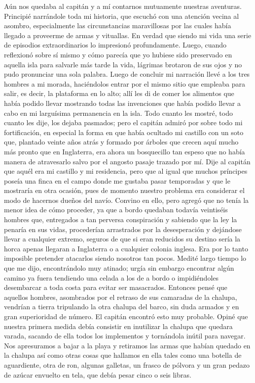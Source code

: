 \documentclass{novela}
\begin{document}
    Aún nos quedaba al capitán y a mí contarnos mutuamente nuestras aventuras. Principié narrándole toda mi historia, que escuchó con una atención vecina al asombro, especialmente las circunstancias maravillosas por las cuales había llegado a proveerme de armas y vituallas. En verdad que siendo mi vida una serie de episodios extraordinarios lo impresionó profundamente. Luego, cuando reflexionó sobre sí mismo y cómo parecía que yo hubiese sido preservado en aquella isla para salvarle más tarde la vida, lágrimas brotaron de sus ojos y no pudo pronunciar una sola palabra.
    Luego de concluir mi narración llevé a los tres hombres a mi morada, haciéndolos entrar por el mismo sitio que empleaba para salir, es decir, la plataforma en lo alto; allí les di de comer los alimentos que había podido llevar mostrando todas las invenciones que había podido llevar a cabo en mi larguísima permanencia en la isla.
    Todo cuanto les mostré, todo cuanto les dije, los dejaba pasmados; pero el capitán admiró por sobre todo mi fortificación, en especial la forma en que había ocultado mi castillo con un soto que, plantado veinte años atrás y formado por árboles que crecen aquí mucho más pronto que en Inglaterra, era ahora un bosquecillo tan espeso que no había manera de atravesarlo salvo por el angosto pasaje trazado por mí. Dije al capitán que aquél era mi castillo y mi residencia, pero que al igual que muchos príncipes poseía una finca en el campo donde me gustaba pasar temporadas y que le mostraría en otra ocasión, pues de momento nuestro problema era considerar el modo de hacernos dueños del navío.
    Convino en ello, pero agregó que no tenía la menor idea de cómo proceder, ya que a bordo quedaban todavía veintiséis hombres que, entregados a tan perversa conspiración y sabiendo que la ley la penaría en sus vidas, procederían arrastrados por la desesperación y dejándose llevar a cualquier extremo, seguros de que si eran reducidos su destino sería la horca apenas llegaran a Inglaterra o a cualquier colonia inglesa. Era por lo tanto imposible pretender atacarlos siendo nosotros tan pocos.
    Medité largo tiempo lo que me dijo, encontrándolo muy atinado; urgía sin embargo encontrar algún camino ya fuera tendiendo una celada a los de a bordo o impidiéndoles desembarcar a toda costa para evitar ser masacrados.
    Entonces pensé que aquellos hombres, asombrados por el retraso de sus camaradas de la chalupa, vendrían a tierra tripulando la otra chalupa del barco, sin duda armados y en gran superioridad de número. El capitán encontró esto muy probable.
    Opiné que nuestra primera medida debía consistir en inutilizar la chalupa que quedara varada, sacando de ella todos los implementos y tornándola inútil para navegar. Nos apresuramos a bajar a la playa y retiramos las armas que habían quedado en la chalupa así como otras cosas que hallamos en ella tales como una botella de aguardiente, otra de ron, algunas galletas, un frasco de pólvora y un gran pedazo de azúcar envuelto en tela, que debía pesar cinco o seis libras.
\end{document}

